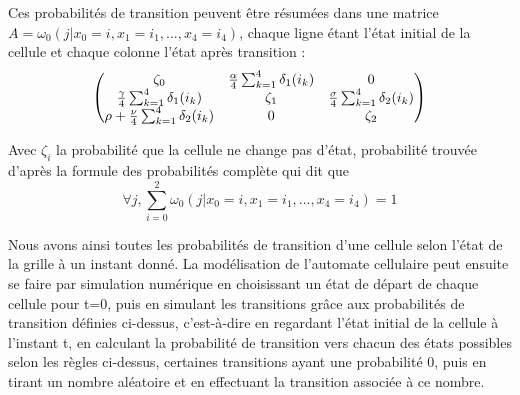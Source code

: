 Ces probabilités de transition peuvent être résumées dans une matrice $A=\omega_0(j|x_0=i, x_1=i_1, ..., x_4=i_4)$, chaque ligne étant l'état initial de la cellule et chaque colonne l'état après transition : 
$$\begin{pmatrix}
\zeta_0 & \frac{\alpha}{4}\sum_{k=1}^{4}\delta_{1}(i_k)\end{equation} & 0 \\
\frac{\gamma}{4}\sum_{k=1}^{4}\delta_{1}(i_k) & \zeta_1 & \frac{\sigma}{4}\sum_{k=1}^{4}\delta_{2}(i_k) \\
\rho + \frac{\nu}{4}\sum_{k=1}^{4}\delta_{2}(i_k) & 0 & \zeta_2
\end{pmatrix}$$

Avec $\zeta_i$ la probabilité que la cellule ne change pas d'état, probabilité trouvée d'après la formule des probabilités complète qui dit que \begin{equation}
\forall j, \sum_{i=0}^2\omega_0(j|x_0=i, x_1=i_1, ..., x_4=i_4)=1\end{equation}

Nous avons ainsi toutes les probabilités de transition d'une cellule selon l'état de la grille à un instant donné. La modélisation de l'automate cellulaire peut ensuite se faire par simulation numérique en choisissant un état de départ de chaque cellule pour t=0, puis en simulant les transitions grâce aux probabilités de transition définies ci-dessus, c'est-à-dire en regardant l'état initial de la cellule à l'instant t, en calculant la probabilité de transition vers chacun des états possibles selon les règles ci-dessus, certaines transitions ayant une probabilité 0, puis en tirant un nombre aléatoire et en effectuant la transition associée à ce nombre. 
